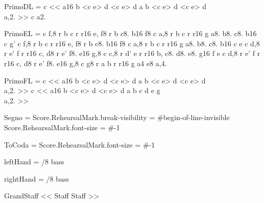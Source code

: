 PrimoDL = {
 { \relative c { << { a16 b <c e> d <c e> d a b <c e> d <c e> d} \\ { a,2. } >> } }
 { \relative c { a2. } }
}

PrimoEL = {
 { \relative c { f,8 r b c r r16 e, f8 r b c8. b16 f8 } }
 { \relative c { a,8 r b c r r16 g a8. b8. c8. b16 c g' } }
 { \relative c { f,8 r b c r r16 e, f8 r b c8. b16 f8 } }
 { \relative c { a,8 r b c r r16 g a8. b8. c8. b16 c e } }
 { \relative c { d,8 r e' f r r16 c, d8 r e' f8. e16 g,8 } }
 { \relative c { c,8 r d' e r r16 b, c8. d8. e8. g16 f e } }
 { \relative c { d,8 r e' f r r16 c, d8 r e' f8. e16 g,8 } }
 { \relative c { g8 r a b r r16 g a4 e8 a,4. } }
}

PrimoFL = {
 { \relative c { << { a16 b <c e> d <c e> d a b <c e> d <c e> d} \\ { a,2. } >> } }
 { \relative c { << { a16 b <c e> d <c e> d a b c d e g } \\ { a,2. } >> } }
}

Segno = {
    \once \override Score.RehearsalMark.break-visibility = #begin-of-line-invisible
    \once \override Score.RehearsalMark.font-size = #-1
    \mark {}
}

ToCoda = {
    \once \override Score.RehearsalMark.font-size = #-1
    \mark {}
}

leftHand = {
  /8
  \clef bass
  \PrimoAL
  \Segno
  \PrimoBL
  \PrimoCL
  \ToCoda
  \PrimoDL
  \PrimoEL
  \PrimoFL
  \PrimoCL
  \PrimoDL
}

rightHand = {
  /8
  \clef bass
  \PrimoAR
  \Segno
  \PrimoBR
  \mark {}
  \PrimoCR
  \ToCoda
  \PrimoDR
  \mark {}
  \PrimoER
  \PrimoFR
  \mark {}
  \PrimoCR
  \PrimoDR
}

\new GrandStaff <<
  \new Staff \rightHand
  \new Staff \leftHand
>>
